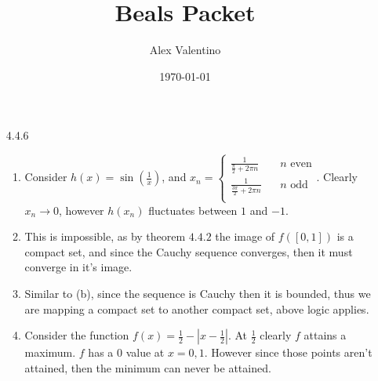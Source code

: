 \documentclass[12pt, letterpaper]{article}
\date{\today}
\author{Alex Valentino}
\title{Beals Packet}
\begin{document}
\begin{enumerate}
	\item[4.4.6]
	\begin{enumerate}
		\item Consider $h(x) = \sin(\frac{1}{x})$, and 
		$x_n = \begin{cases} \frac{1}{\frac{\pi}{2} + 2 \pi n}\ & \text{ $n$ even}\\ \frac{1}{\frac{3\pi}{2} + 2 \pi n}\ & \text{ $n$ odd}\\\end{cases}$.  Clearly $x_n \to 0$, however $h(x_n)$ fluctuates between $1$ and $-1$.  
		\item This is impossible, as by theorem $4.4.2$ the image of $f([0,1])$ is a compact set, and since the Cauchy 
		sequence converges, then it must converge in it's image.  
		\item Similar to (b), since the sequence is Cauchy then it is bounded, thus we are mapping a compact set to another compact set, above logic applies.  
		\item Consider the function $f(x) = \frac{1}{2} - |x-\frac{1}{2}|$.  At $\frac{1}{2}$ clearly $f$ attains a maximum.  
		$f$ has a 0 value at $x=0,1$.  However since those points aren't attained, then the minimum can never be attained.  
	\end{enumerate}
\end{enumerate}
\end{document}
